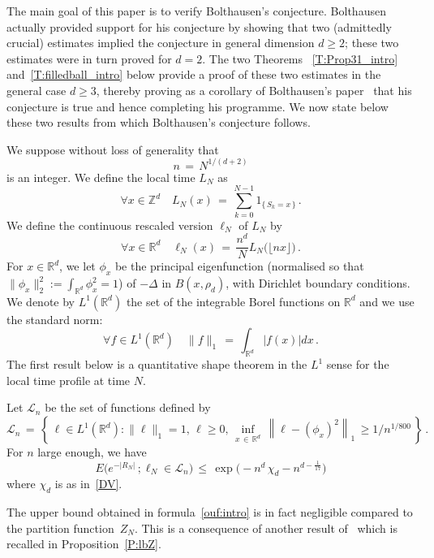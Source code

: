 \documentclass[AHL, Unicode, longabstracts, published]{cedram}
\newcommand*\Zd {{\mathbb Z^d}}
\newcommand*\Rd {{\mathbb R^d}}
\newcommand*\R{\mathbb{R}}
\newcommand{\cL}{\mathcal{L}}
\let\oldforall\forall
\renewcommand*{\forall}{\mathrel{\oldforall}}
\begin{document}
The main goal of this paper is to verify Bolthausen's conjecture. Bolthausen actually provided support for his conjecture by showing that two (admittedly crucial) estimates implied the conjecture in general dimension $d \ge 2$; these two estimates were in turn proved for $d = 2$. The two Theorems ~\ref{T:Prop31_intro} and~\ref{T:filledball_intro} below provide a proof of these two estimates in the general case $d \ge 3$, thereby proving as a corollary of Bolthausen's paper~\cite{BO} that his conjecture is true and hence completing his programme. We now state below these two results from which Bolthausen's conjecture follows.

We suppose without loss of generality that
\[
n\, =\, N^{1/(d+2)}
\]
is an integer. We define the
local time $L_N$ as
\begin{equation*}
\forall x\in\Zd\quad L_N(x)\,=\,
\sum_{k=0}^{N-1}1_{\{\,S_k=x\,\}}\,.
\end{equation*}
We define the continuous rescaled version $\ell_N$ of $L_N$ by
\begin{equation}\label{D:rescaledLN:intro}
\forall x\in\Rd\quad \ell_N(x)\,=\,
\frac{n^d}{N}{L_N\big(\lfloor nx\rfloor\big)}\,.
\end{equation}
For $x \in \R^d$, we let $\phi_x$ be the principal eigenfunction (normalised so that $\|\phi_x\|_2^2 := \int_{\R^d} \phi_x^2 = 1$) of $- \Delta$ in $B(x, \rho_d)$, with Dirichlet boundary conditions. We denote by $L^1(\R^d) $ the set of the integrable Borel functions on $\R^d$ and we use the standard norm:
\[
\forall f \in L^1(\R^d)\quad \|f\|_1\, =\, \int_{\R^d} |f(x)|dx\,.
\]
The first result below is a quantitative shape theorem in the $L^1$ sense for the local time profile at time $N$.

\begin{theo}\label{T:Prop31_intro}
Let $\cL_n$ be the set of functions defined by
\[
\cL_n\,=\,\left\{\,
\ell\in L^1(\Rd): \|\ell\|_1=1,\, \ell\geq 0,\,
\inf_{x\,\in\,\Rd}\,\left\|\ell-(\phi_x)^2\right\|_1\,\geq 1/n^{1/800}\,\right\}\,.
\]
For $n$ large enough, we have
\begin{equation}\label{ouf:intro}
E\big(e^{-|R_N|}\,;
\ell_N\in\cL_n\big)\,\leq\,
\exp\Big(- n^d\,
\chi_d - n^{d-\frac{1}{17}}\Big)
\end{equation}
where $\chi_d$ is as in~\eqref{DV}.
\end{theo}
The upper bound obtained in formula~\eqref{ouf:intro} is in fact negligible compared to the partition function~$Z_N$. This is a consequence of another result of~\cite{BO} which is recalled in Proposition~\ref{P:lbZ}.
\end{document}
